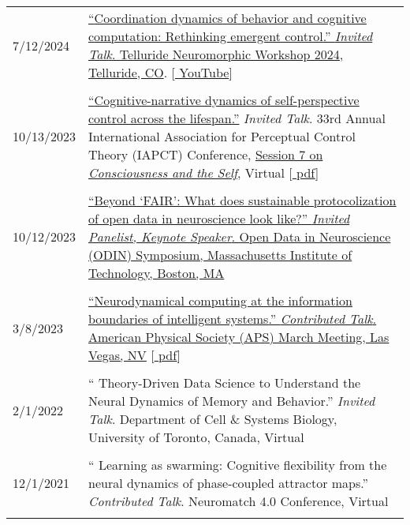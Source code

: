 \documentclass[10pt]{article}
\newcommand{\itemtitle}[1]{{\color{hopkinsblue}\ul{#1}}}
\newcommand{\unpubtitle}[1]{{\color{hopkinsblue} #1}}
\begin{document}
\begin{longtable}{@{\hspace{0.0in}}l>{\raggedright\arraybackslash}p{}}
  \tabularnewline
  7/12/2024 &
  \href{https://sites.google.com/view/telluride-2024/home}{``\itemtitle{Coordination 
      dynamics of behavior and cognitive computation: Rethinking emergent control}.'' 
      \emph{Invited Talk}. Telluride Neuromorphic Workshop 2024, Telluride, CO}.
    [\href{https://youtu.be/7b69GXB2jBc?si=xuzXOZDqXWl6I_sO}{\unpubtitle{YouTube}}] \\
  \tabularnewline
  10/13/2023 & \href{https://jdmonaco.com/files/monaco-IAPCT-2023-slides.pdf}
    {``\itemtitle{Cognitive-narrative dynamics of self-perspective control
    across the lifespan}.''} \emph{Invited Talk}. 33rd Annual International
    Association for Perceptual Control Theory (IAPCT) Conference, 
  \href{https://www.iapct.org/uncategorized/utc-4-boston-time-zone/}
  {Session 7 on \unpubtitle{\emph{Consciousness and the Self}}}, Virtual
  [\href{https://jdmonaco.com/files/monaco-IAPCT-2023-slides.pdf}{\unpubtitle{pdf}}] \\
  \tabularnewline
  10/12/2023 & \href{https://odin.mit.edu/schedule.html}
    {``\itemtitle{Beyond ‘FAIR’: What does sustainable protocolization of
    open data in neuroscience look like?}'' \emph{Invited Panelist, Keynote
    Speaker}. Open Data in Neuroscience (ODIN) Symposium, Massachusetts Institute
  of Technology, Boston, MA} \\
  \tabularnewline
  3/8/2023 & \href{https://meetings.aps.org/Meeting/MAR23/Session/M01.13}
  {``\itemtitle{Neurodynamical computing at the information boundaries of
    intelligent systems}.'' \emph{Contributed Talk}. American Physical Society (APS)
  March Meeting, Las Vegas, NV}
  [\href{https://jdmonaco.com/files/monaco-APS-March-Meeting-2023-slides.pdf}{\unpubtitle{pdf}}] \\
  \tabularnewline
  2/1/2022 & ``\unpubtitle{Theory-Driven Data Science to
  Understand the Neural Dynamics of Memory and Behavior}.'' \emph{Invited Talk}.
  Department of Cell \& Systems Biology, University of Toronto, Canada, Virtual \\
  \tabularnewline
  12/1/2021 & ``\unpubtitle{Learning as swarming: Cognitive
  flexibility from the neural dynamics of phase-coupled attractor maps}.''
  \emph{Contributed Talk}. Neuromatch 4.0 Conference, Virtual \\
  \tabularnewline

\end{longtable}
\end{document}
